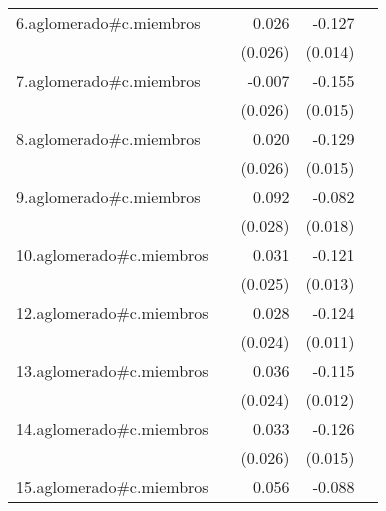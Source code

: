 {\begin{longtable}{l*{4}{D{.}{.}{-1}}}
\addlinespace
6.aglomerado#c.miembros&                     &       0.026         &      -0.127\sym{***}&                     \\
            &                     &     (0.026)         &     (0.014)         &                     \\
\addlinespace
7.aglomerado#c.miembros&                     &      -0.007         &      -0.155\sym{***}&                     \\
            &                     &     (0.026)         &     (0.015)         &                     \\
\addlinespace
8.aglomerado#c.miembros&                     &       0.020         &      -0.129\sym{***}&                     \\
            &                     &     (0.026)         &     (0.015)         &                     \\
\addlinespace
9.aglomerado#c.miembros&                     &       0.092\sym{**} &      -0.082\sym{***}&                     \\
            &                     &     (0.028)         &     (0.018)         &                     \\
\addlinespace
10.aglomerado#c.miembros&                     &       0.031         &      -0.121\sym{***}&                     \\
            &                     &     (0.025)         &     (0.013)         &                     \\
\addlinespace
12.aglomerado#c.miembros&                     &       0.028         &      -0.124\sym{***}&                     \\
            &                     &     (0.024)         &     (0.011)         &                     \\
\addlinespace
13.aglomerado#c.miembros&                     &       0.036         &      -0.115\sym{***}&                     \\
            &                     &     (0.024)         &     (0.012)         &                     \\
\addlinespace
14.aglomerado#c.miembros&                     &       0.033         &      -0.126\sym{***}&                     \\
            &                     &     (0.026)         &     (0.015)         &                     \\
\addlinespace
15.aglomerado#c.miembros&                     &       0.056         &      -0.088\sym{***}&                     \\

\end{longtable}}
